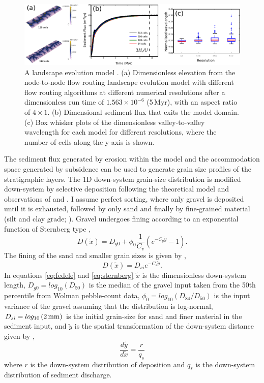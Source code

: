 \begin{figure}
\centering
\includegraphics[width=\textwidth]{./figures/ch2-MFD.pdf}
\caption{A landscape evolution model \citep[see][]{armitage-2019}. (a) Dimensionless elevation from the node-to-node flow routing landscape evolution model with different flow routing algorithms at different numerical resolutions after a dimensionless run time of $1.563\times10^{-6}$ (5\,Myr), with an aspect ratio of $4\times1$. (b) Dimensional sediment flux that exits the model domain. (c) Box whisker plots of the dimensionless valley-to-valley wavelength for each model for different resolutions, where the number of cells along the y-axis is shown.}
\label{fg:MFD}
\end{figure}

The sediment flux generated by erosion within the model and the accommodation space generated by subsidence can be used to generate grain size profiles of the stratigraphic layers. The 1D down-system grain-size distribution is modified down-system by selective deposition following the theoretical model and observations of \cite{fedele-2007} and \cite{duller-etal-2010}. I assume perfect sorting, where only gravel is deposited until it is exhausted, followed by only sand and finally by fine-grained material (silt and clay grade; \citealp{paola-etal-1992}). Gravel undergoes fining according to an exponential function of Sternberg type \citep{fedele-2007,duller-etal-2010},
\begin{equation}
D(\tilde{x}) = D_{g0} + \phi_{0}\frac{1}{C_{v}}\left( e^{-C_{g}\tilde{y}}-1 \right).
\label{eq:fedele}
\end{equation}
The fining of the sand and smaller grain sizes is given by \cite{sternberg-1875},
\begin{equation}
D(\tilde{x}) = D_{si}e^{-C_{s}\tilde{y}}.
\label{eq:sternberg}
\end{equation}
In equations \ref{eq:fedele} and \ref{eq:sternberg} $\tilde{x}$ is the dimensionless down-system length, $D_{g0} = log_{10}\left(D_{50}\right)$ is the median of the gravel input taken from the 50th percentile from Wolman pebble-count data, $\phi_{0} = log_{10}\left( D_{84}/D_{50} \right)$ is the input variance of the gravel assuming that the distribution is log-normal, $D_{si} = log_{10}\left( 2\,{\rm mm} \right)$ is the initial grain-size for sand and finer material in the sediment input, and $\tilde{y}$ is the spatial transformation of the down-system distance given by \citep{paola-1995},
\begin{equation}
\frac{d\tilde{y}}{d\tilde{x}} = \frac{r}{q_{s}}
\end{equation}
where $r$ is the down-system distribution of deposition and $q_{s}$ is the down-system distribution of sediment discharge.


